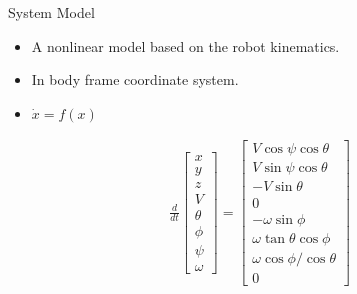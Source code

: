\documentclass[hyperref={pdfpagelabels=false}]{beamer}
\begin{document}
\begin{frame}{System Model}
\begin{itemize}
\item A nonlinear model based on the robot kinematics.
\item In body frame coordinate system.
\item $\dot{x} = f(x)$
\end{itemize}
\begin{align*}
\frac{d}{dt}\left[\begin{array}{c}
x \\ y \\ z \\ V \\ \theta \\ \phi \\ \psi \\ \omega
\end{array}\right] =
\left[\begin{array}{c}
V\cos\psi\cos\theta \\
V\sin\psi\cos\theta \\
-V\sin\theta \\
0 \\
-\omega\sin\phi \\
\omega\tan\theta\cos\phi \\
\omega\cos\phi/\cos\theta \\
0
\end{array}\right]
\end{align*}
\end{frame}
\end{document}
